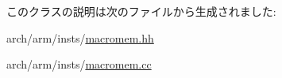 このクラスの説明は次のファイルから生成されました:\begin{DoxyCompactItemize}
\item 
arch/arm/insts/\hyperlink{macromem_8hh}{macromem.hh}\item 
arch/arm/insts/\hyperlink{macromem_8cc}{macromem.cc}\end{DoxyCompactItemize}
